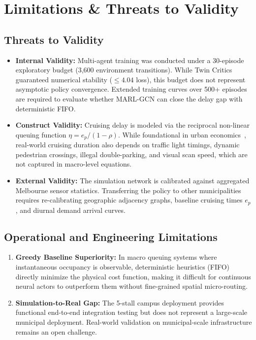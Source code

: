 \documentclass[journal]{IEEEtran}
\begin{document}
\section{Limitations \& Threats to Validity}
\label{sec:limitations}

\subsection{Threats to Validity}
\begin{itemize}
    \item \textbf{Internal Validity:} Multi-agent training was conducted under a 30-episode exploratory budget (3,600 environment transitions). While Twin Critics guaranteed numerical stability ($\le 4.04$ loss), this budget does not represent asymptotic policy convergence. Extended training curves over 500+ episodes are required to evaluate whether MARL-GCN can close the delay gap with deterministic FIFO.
    \item \textbf{Construct Validity:} Cruising delay is modeled via the reciprocal non-linear queuing function $\eta = e_p / (1 - \rho)$. While foundational in urban economics~\cite{shoup2005high,arnott2006economic}, real-world cruising duration also depends on traffic light timings, dynamic pedestrian crossings, illegal double-parking, and visual scan speed, which are not captured in macro-level equations.
    \item \textbf{External Validity:} The simulation network is calibrated against aggregated Melbourne sensor statistics. Transferring the policy to other municipalities requires re-calibrating geographic adjacency graphs, baseline cruising times $e_p$, and diurnal demand arrival curves.
\end{itemize}

\subsection{Operational and Engineering Limitations}
\begin{enumerate}
    \item \textbf{Greedy Baseline Superiority:} In macro queuing systems where instantaneous occupancy is observable, deterministic heuristics (FIFO) directly minimize the physical cost function, making it difficult for continuous neural actors to outperform them without fine-grained spatial micro-routing.
    \item \textbf{Simulation-to-Real Gap:} The 5-stall campus deployment provides functional end-to-end integration testing but does not represent a large-scale municipal deployment. Real-world validation on municipal-scale infrastructure remains an open challenge.
\end{enumerate}
\end{document}
